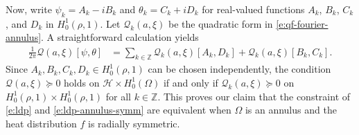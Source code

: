 \documentclass[a4paper, 10pt]{amsart}
\numberwithin{equation}{section}
\theoremstyle{plain}
\theoremstyle{definition}
\theoremstyle{remark}
\newcommand{\cal}[1]{\mathcal{#1}}
\newcommand{\Z}{\mathbb{Z}}
\newcommand{\Hoz}{H_0^1(\Omega)}
\newcommand{\QF}{\mathcal{Q}}
\begin{document}
Now, write $\psi_k = A_k - iB_k$ and $\theta_k = C_k+iD_k$ for real-valued functions $A_k$, $B_k$, $C_k$, and $D_k$ in $H^1_0(\rho,1)$. Let $\QF_k(a,\xi)$ be the quadratic form in \cref{e:qf-fourier-annulus}. A straightforward calculation yields
\begin{align*}
    \frac{1}{2\pi}\QF(a,\xi)[\psi,\theta]
    &=\sum_{k \in \Z} 
    \QF_k(a,\xi)[A_k,D_k] +
    \QF_k(a,\xi)[B_k,C_k].
\end{align*}
Since $A_k,B_k,C_k,D_k \in H^1_0(\rho,1)$ can be chosen independently, the condition $\QF(a,\xi)\succeq 0$ holds on $\cal{H}\times\Hoz$ if and only if $\QF_k(a,\xi) \succeq 0$ on $H^1_0(\rho,1) \times H^1_0(\rho,1)$ for all $k\in \Z$. This proves our claim that the constraint of \cref{e:ldp} and \cref{e:ldp-annulus-symm} are equivalent when $\Omega$ is an annulus and the heat distribution $f$ is radially symmetric.





\end{document}

